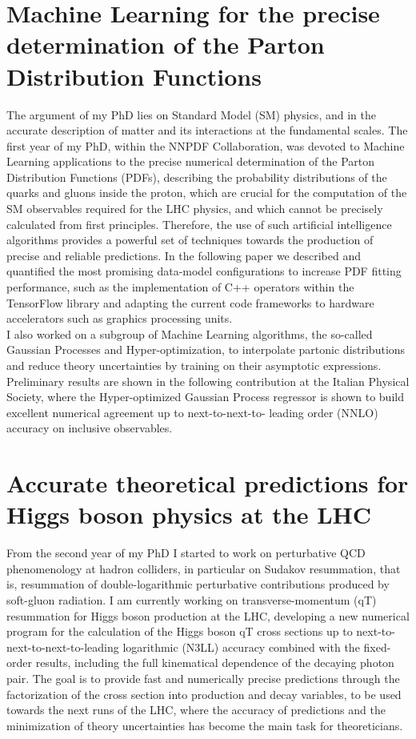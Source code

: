 \documentclass[12pt]{article}
\begin{document}
\section{Machine Learning for the precise determination of the Parton Distribution Functions}
The argument of my PhD lies on Standard Model (SM) physics, and in the accurate description of matter and its interactions at the fundamental scales. The first year of my PhD, within the NNPDF Collaboration, was devoted to Machine Learning applications to the precise numerical determination of the Parton Distribution Functions (PDFs), describing the probability distributions of the quarks and gluons inside the proton, which are crucial for the computation of the SM observables required for the LHC physics, and which cannot be precisely calculated from first principles. Therefore, the use of such artificial intelligence algorithms provides a powerful set of techniques towards the production of precise and reliable predictions. In the following paper we described and quantified the most promising data-model configurations to increase PDF fitting performance, such as the implementation of
C++ operators within the TensorFlow library and adapting the current code frameworks to
hardware accelerators such as graphics processing units. \\

I also worked on a subgroup of Machine Learning algorithms, the so-called Gaussian Processes and Hyper-optimization, to interpolate partonic distributions and reduce theory uncertainties by training on their asymptotic expressions. Preliminary results are shown in the following contribution at the Italian Physical Society, where the Hyper-optimized Gaussian Process regressor is shown to build excellent numerical agreement up to next-to-next-to- leading order (NNLO) accuracy on inclusive observables. 

\section{Accurate theoretical predictions for Higgs boson physics at the LHC}
From the second year of my PhD I started to work on perturbative QCD phenomenology at hadron colliders, in particular on Sudakov resummation, that is, resummation of double-logarithmic perturbative contributions produced by soft-gluon radiation. I am currently working on transverse-momentum (qT) resummation for Higgs boson production at the LHC, developing a new numerical program for the calculation of the Higgs boson qT cross sections up to next-to-next-to-next-to-leading logarithmic (N3LL) accuracy combined with the fixed-order results, including the full kinematical dependence of the decaying photon pair. The goal is to provide fast and numerically precise predictions through the factorization of the cross section into production and decay variables, to be used towards the next runs of the LHC, where the accuracy of predictions and the minimization of theory uncertainties has become the main task for theoreticians.\\
\end{document}
